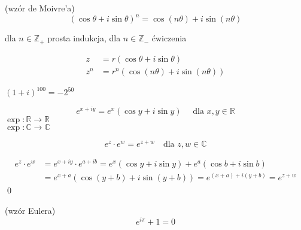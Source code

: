 \begin{wn} (wzór de Moivre'a) 
    \[ (\cos\theta + i\sin\theta)^n = \cos(n\theta) + i\sin(n\theta) \]  
\end{wn}
\begin{dd} 
    dla $n \in \mathbb{Z}_+$ prosta indukcja,
    dla $n \in \mathbb{Z}_-$ ćwiczenia 
\end{dd} 
\begin{wn}
    \begin{align*}
        z &= r(\cos\theta + i\sin\theta) \\
        z^n &= r^n(\cos(n\theta)+i\sin(n\theta))
    \end{align*}
\end{wn} 
\begin{prz}
    $(1+i)^{100} = -2^{50}$
\end{prz}

\begin{df} 
    \[ e^{x+iy} = e^x(\cos y + i\sin y) \quad \text{ dla } x,y \in \mathbb{R} \] 
    $ \exp: \mathbb{R} \to \mathbb{R} $ \\ 
    $\exp : \mathbb{C} \to \mathbb{C} $
\end{df}
\begin{ft} 
    \[ e^z \cdot e^w = e^{z+w} \quad \text{dla }z,w \in \mathbb{C} \]
\end{ft}
\begin{dd} 
    \begin{align*}
         e^z \cdot e^w &= e^{x +iy} \cdot e^{a + ib} = e^x(\cos y + i \sin y) + e^a(\cos b + i\sin b) \\ 
    &= e^{x+a}(\cos(y+b) + i\sin(y+b)) = e^{(x+a) + i(y+b)} = e^{z+w}  
    \end{align*}
    \hfill \qed
\end{dd} 
\begin{wn} (wzór Eulera) \[ e^{i\pi} + 1 = 0 \] \end{wn}
